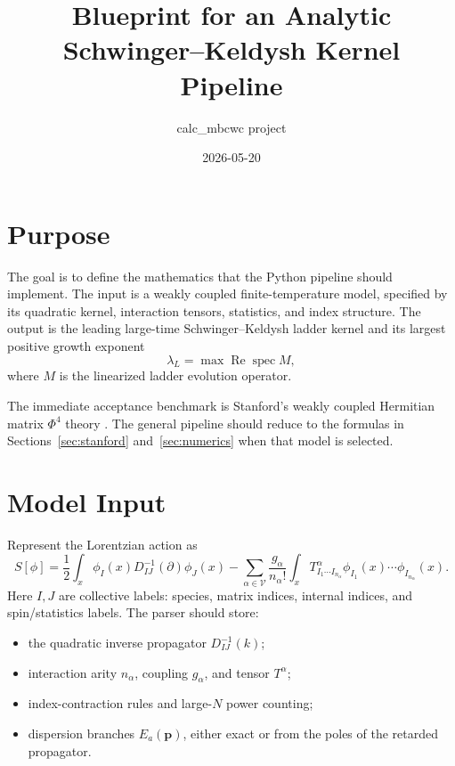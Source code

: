 \documentclass[11pt]{article}
\title{Blueprint for an Analytic Schwinger--Keldysh Kernel Pipeline}
\author{calc\_mbcwc project}
\date{2026-05-20}
\begin{document}
\maketitle

\section{Purpose}

The goal is to define the mathematics that the Python pipeline should
implement.  The input is a weakly coupled finite-temperature model, specified by
its quadratic kernel, interaction tensors, statistics, and index structure. The
output is the leading large-time Schwinger--Keldysh ladder kernel and its
largest positive growth exponent
\begin{equation}
  \lambda_L = \max \operatorname{Re}\operatorname{spec} M ,
\end{equation}
where \(M\) is the linearized ladder evolution operator.

The immediate acceptance benchmark is Stanford's weakly coupled Hermitian
matrix \(\Phi^4\) theory \cite{Stanford:2015owe}.  The general pipeline should
reduce to the formulas in Sections~\ref{sec:stanford} and~\ref{sec:numerics}
when that model is selected.

\section{Model Input}

Represent the Lorentzian action as
\begin{equation}
  S[\phi]
  =
  \frac{1}{2}\int_x \phi_I(x) D^{-1}_{IJ}(\partial)\phi_J(x)
  -
  \sum_{\alpha\in \mathcal V}
  \frac{g_\alpha}{n_\alpha!}
  \int_x
  T^\alpha_{I_1\cdots I_{n_\alpha}}
  \phi_{I_1}(x)\cdots \phi_{I_{n_\alpha}}(x).
  \label{eq:model}
\end{equation}
Here \(I,J\) are collective labels: species, matrix indices, internal indices,
and spin/statistics labels. The parser should store:
\begin{itemize}
  \item the quadratic inverse propagator \(D^{-1}_{IJ}(k)\);
  \item interaction arity \(n_\alpha\), coupling \(g_\alpha\), and tensor
  \(T^\alpha\);
  \item index-contraction rules and large-\(N\) power counting;
  \item dispersion branches \(E_a(\mathbf p)\), either exact or from the poles
  of the retarded propagator.
\end{itemize}
\end{document}
